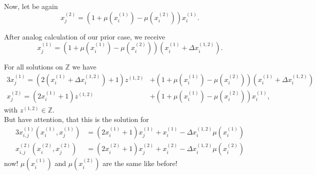 Now, let be again
\begin{equation}
	x_{j}^{\left(2\right)} = \left(1 + \mu\left(x_{i}^{\left(1\right)}\right) - \mu\left(x_{i}^{\left(2\right)}\right)\right)x_{i}^{\left(1\right)}.
\label{eq:solxj2deltagen}
\end{equation}

After analog calculation of our prior case, we receive
\begin{equation}
	x_{j}^{\left(1\right)} = \left(1 + \mu\left(x_{i}^{\left(1\right)}\right) - \mu\left(x_{i}^{\left(2\right)}\right)\right)\left(x_{i}^{\left(1\right)} + \Delta x_{i}^{\left(1,2\right)}\right).
\label{eq:solxj1deltagen}
\end{equation}

For all solutions on $\mathbb{Z}$ we have
\begin{alignat}{3}
	x_{j}^{\left(1\right)} = \left(2\left(x_{i}^{\left(1\right)} + \Delta x_{i}^{\left(1,2\right)}\right) + 1\right)z^{\left(1,2\right)} &+ \left(1 + \mu\left(x_{i}^{\left(1\right)}\right) - \mu\left(x_{i}^{\left(2\right)}\right)\right)\left(x_{i}^{\left(1\right)} + \Delta x_{i}^{\left(1,2\right)}\right) \label{eq:solxj1deltagen_all} \\
	x_{j}^{\left(2\right)} = \left(2x_{i}^{\left(1\right)} + 1\right)z^{\left(1,2\right)} &+ \left(1 + \mu\left(x_{i}^{\left(1\right)}\right) - \mu\left(x_{i}^{\left(2\right)}\right)\right)x_{i}^{\left(1\right)} \label{eq:solxj2deltagen_all},
\end{alignat}
with $z^{\left(1,2\right)} \in \mathbb{Z}$.\\

But have attention, that this is the solution for 
\begin{alignat}{3}
	x_{i,j}^{\left(1\right)}\left(x_{i}^{\left(1\right)}, x_{j}^{\left(1\right)}\right) &= \left(2x_{i}^{\left(1\right)} + 1\right)x_{j}^{\left(1\right)} + x_{i}^{\left(1\right)} - \Delta x_{i}^{\left(1,2\right)}\mu\left(x_{i}^{\left(1\right)}\right) \label{eq:xijeq_new1} \\
	x_{i,j}^{\left(2\right)}\left(x_{i}^{\left(2\right)}, x_{j}^{\left(2\right)}\right) &= \left(2x_{i}^{\left(2\right)} + 1\right)x_{j}^{\left(2\right)} + x_{i}^{\left(2\right)} - \Delta x_{i}^{\left(1,2\right)}\mu\left(x_{i}^{\left(2\right)}\right) \label{eq:xijeq_new2}
\end{alignat}
now! $\mu\left(x_{i}^{\left(1\right)}\right)$ and $\mu\left(x_{i}^{\left(2\right)}\right)$ are the same like before!
